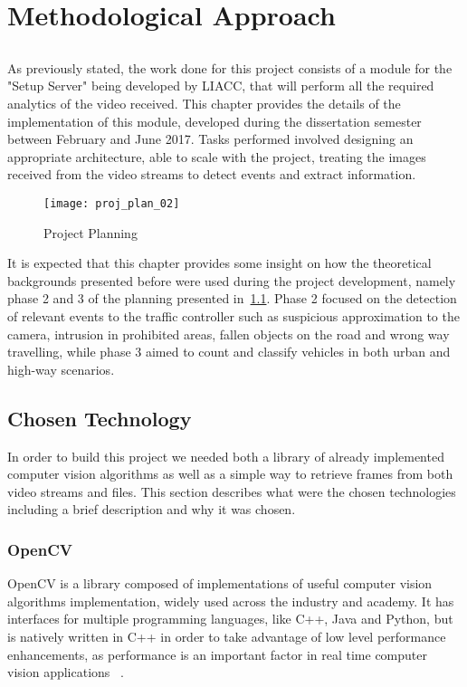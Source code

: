
\chapter{Methodological Approach}\label{chap:chap4}
\section*{}

As previously stated, the work done for this project consists of a module for the "Setup Server" being developed by LIACC, that will perform all the required analytics of the video received. This chapter provides the details of the implementation of this module, developed during the dissertation semester between February and June 2017. Tasks performed involved designing an appropriate architecture, able to scale with the project, treating the images received from the video streams to detect events and extract information. 

\begin{figure}[h]
  \begin{center}
    \leavevmode
    \texttt{[image: proj\_plan\_02]}
    \caption{Project Planning}
    \label{fig:proj_plan}
  \end{center}
\end{figure}


It is expected that this chapter provides some insight on how the theoretical backgrounds presented before were used during the project development, namely phase 2 and 3 of the planning presented in~\ref{fig:proj_plan}. Phase 2 focused on the detection of relevant events to the traffic controller such as suspicious approximation to the camera, intrusion in prohibited areas, fallen objects on the road and wrong way travelling, while phase 3 aimed to count and classify vehicles in both urban and high-way scenarios.

\section{Chosen Technology}

In order to build this project we needed both a library of already implemented computer vision algorithms as well as a simple way to retrieve frames from both video streams and files. This section describes what were the chosen technologies including a brief description and why it was chosen.

\subsection{OpenCV}
OpenCV is a library composed of implementations of useful computer vision algorithms implementation, widely used across the industry and academy. It has interfaces for multiple programming languages, like C++, Java and Python, but is natively written in C++ in order to take advantage of low level performance enhancements, as performance is an important factor in real time computer vision applications ~\cite{opencv_about_2017}.

